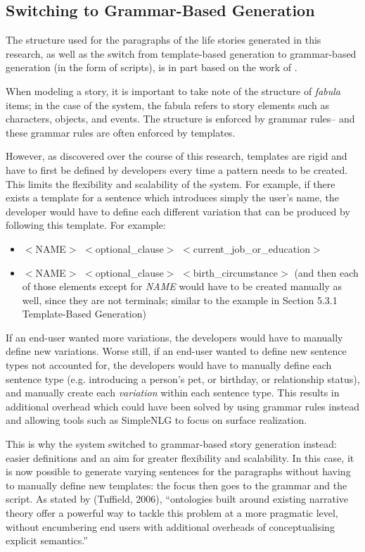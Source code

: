 \subsection{Switching to Grammar-Based Generation}
The structure used for the paragraphs of the life stories generated in this research, as well as the switch from template-based generation to grammar-based generation (in the form of scripts), is in part based on the work of \cite{Tuffield06ontologicalapproaches}.

When modeling a story, it is important to take note of the structure of \textit{fabula} items; in the case of the system, the fabula refers to story elements such as characters, objects, and events. The structure is enforced by grammar rules-- and these grammar rules are often enforced by templates.

However, as discovered over the course of this research, templates are rigid and have to first be defined by developers every time a pattern needs to be created. This limits the flexibility and scalability of the system. For example, if there exists a template for a sentence which introduces simply the user's name, the developer would have to define each different variation that can be produced by following this template. For example:

\begin{center}
\begin{itemize}
	\item $<$NAME$>$ $<$optional\_clause$>$ $<$current\_job\_or\_education$>$
	\item $<$NAME$>$ $<$optional\_clause$>$ $<$birth\_circumstance$>$
	(and then each of those elements except for \textit{NAME} would have to be created manually as well, since they are not terminals; similar to the example in Section 5.3.1 Template-Based Generation)
\end{itemize}
\end{center}

If an end-user wanted more variations, the developers would have to manually define new variations. Worse still, if an end-user wanted to define new sentence types not accounted for, the developers would have to manually define each sentence type (e.g. introducing a person's pet, or birthday, or relationship status), and manually create each \textit{variation} within each sentence type. This results in additional overhead which could have been solved by using grammar rules instead and allowing tools such as SimpleNLG to focus on surface realization.

This is why the system switched to grammar-based story generation instead: easier definitions and an aim for greater flexibility and scalability. In this case, it is now possible to generate varying sentences for the paragraphs without having to manually define new templates: the focus then goes to the grammar and the script. As stated by (Tuffield, 2006), ``ontologies built around existing narrative theory offer a powerful way to tackle this problem at a more pragmatic level, without encumbering end users with additional overheads of conceptualising explicit semantics.”

